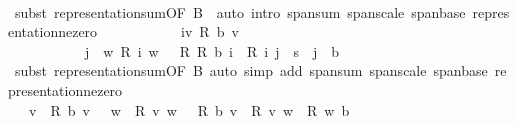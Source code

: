 \begin{isabellebody}
\ \ \ \ \ \ \ \ \isamarkupfalse%
\ {\isacharparenleft}{\kern0pt}subst\ representation{\isacharunderscore}{\kern0pt}sum{\isacharbrackleft}{\kern0pt}OF\ B{\isacharbrackright}{\kern0pt}{\isacharparenright}{\kern0pt}\ \ {\isacharparenleft}{\kern0pt}auto\ intro{\isacharcolon}{\kern0pt}\ span{\isacharunderscore}{\kern0pt}sum\ span{\isacharunderscore}{\kern0pt}scale\ span{\isacharunderscore}{\kern0pt}base\ representation{\isacharunderscore}{\kern0pt}ne{\isacharunderscore}{\kern0pt}zero{\isacharparenright}{\kern0pt}\isanewline
\ \ \ \ \ \ \isamarkupfalse%
\ \isamarkupfalse%
\ {\isachardoublequoteopen}{\isachardot}{\kern0pt}{\isachardot}{\kern0pt}{\isachardot}{\kern0pt}\ {\isacharequal}{\kern0pt}\ {\isacharparenleft}{\kern0pt}{\isasymSum}i{\isasymin}{\isacharbraceleft}{\kern0pt}v{\isachardot}{\kern0pt}\ {\isacharquery}{\kern0pt}R{\isacharprime}{\kern0pt}\ b\ v\ {\isasymnoteq}\ {}{\isacharbraceright}{\kern0pt}{\isachardot}{\kern0pt}\isanewline
\ \ \ \ \ \ \ \ \ \ \ {\isasymSum}j\ {\isasymin}\ {\isacharbraceleft}{\kern0pt}w{\isachardot}{\kern0pt}\ {\isacharquery}{\kern0pt}R\ i\ w\ {\isasymnoteq}\ {}{\isacharbraceright}{\kern0pt}{\isachardot}{\kern0pt}\ {\isacharquery}{\kern0pt}R\ {\isacharparenleft}{\kern0pt}{\isacharparenleft}{\kern0pt}{\isacharquery}{\kern0pt}R{\isacharprime}{\kern0pt}\ b\ i\ {\isacharasterisk}{\kern0pt}\ {\isacharquery}{\kern0pt}R\ i\ j\ {\isacharparenright}{\kern0pt}\ {\isacharasterisk}{\kern0pt}s\ \ j\ {\isacharparenright}{\kern0pt}\ b{\isacharparenright}{\kern0pt}{\isachardoublequoteclose}\isanewline
\ \ \ \ \ \ \ \ \isamarkupfalse%
\ {\isacharparenleft}{\kern0pt}subst\ representation{\isacharunderscore}{\kern0pt}sum{\isacharbrackleft}{\kern0pt}OF\ B{\isacharbrackright}{\kern0pt}{\isacharparenright}{\kern0pt}\ {\isacharparenleft}{\kern0pt}auto\ simp\ add{\isacharcolon}{\kern0pt}\ span{\isacharunderscore}{\kern0pt}sum\ span{\isacharunderscore}{\kern0pt}scale\ span{\isacharunderscore}{\kern0pt}base\ representation{\isacharunderscore}{\kern0pt}ne{\isacharunderscore}{\kern0pt}zero{\isacharparenright}{\kern0pt}\isanewline
\ \ \ \ \ \ \isamarkupfalse%
\ \isamarkupfalse%
\ {\isacartoucheopen}{\isasymdots}\ {\isacharequal}{\kern0pt}\ {\isacharparenleft}{\kern0pt}{\isasymSum}v\ {\isacharbar}{\kern0pt}\ {\isacharquery}{\kern0pt}R{\isacharprime}{\kern0pt}\ b\ v\ {\isasymnoteq}\ {}{\isachardot}{\kern0pt}\ {\isasymSum}w\ {\isacharbar}{\kern0pt}\ {\isacharquery}{\kern0pt}R\ v\ w\ {\isasymnoteq}\ {}{\isachardot}{\kern0pt}\ {\isacharquery}{\kern0pt}R{\isacharprime}{\kern0pt}\ b\ v\ {\isacharasterisk}{\kern0pt}\ {\isacharquery}{\kern0pt}R\ v\ w\ {\isacharasterisk}{\kern0pt}\ {\isacharquery}{\kern0pt}R\ w\ b{\isacharparenright}{\kern0pt}{\isacartoucheclose}\isanewline

\end{isabellebody}
